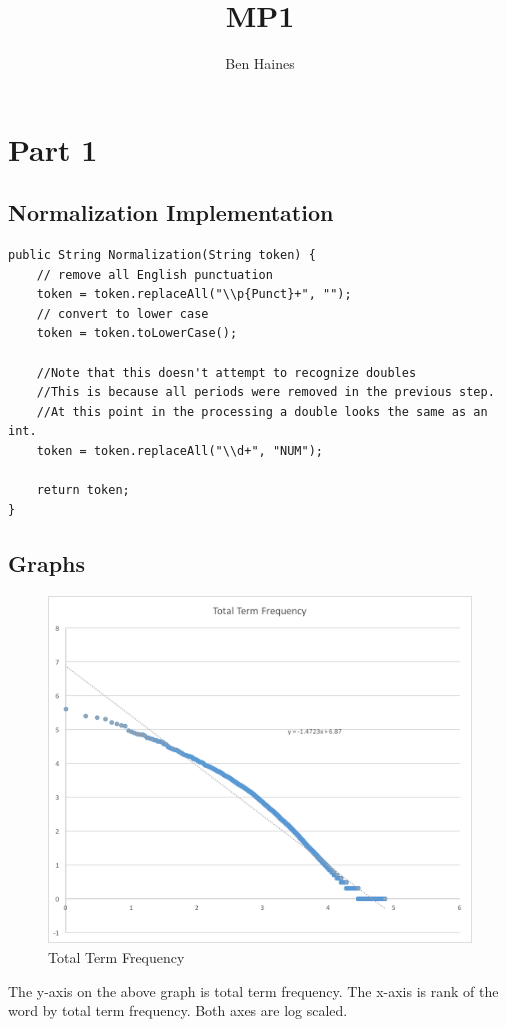 \documentclass[paper=a4, fontsize=11pt]{jhwhw} %
\begin{document}
\title{MP1}
\author{Ben Haines}

\section{Part 1}
\subsection{Normalization Implementation}
\begin{lstlisting}
public String Normalization(String token) {
    // remove all English punctuation
    token = token.replaceAll("\\p{Punct}+", "");
    // convert to lower case
    token = token.toLowerCase();

    //Note that this doesn't attempt to recognize doubles
    //This is because all periods were removed in the previous step.
    //At this point in the processing a double looks the same as an int.
    token = token.replaceAll("\\d+", "NUM");

    return token;
}
\end{lstlisting}

\subsection{Graphs}
\begin{figure}[ht]
    \center
    \caption{Total Term Frequency}
    \includegraphics[scale=.71]{Picture1}
\end{figure}
The y-axis on the above graph is total term frequency. The x-axis is rank of the word by total term frequency. Both axes are log scaled.
\end{document}

